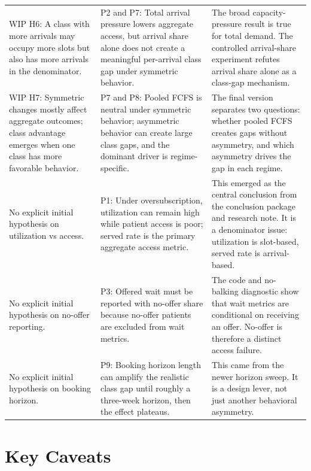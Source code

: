 \documentclass[11pt]{article}
\begin{document}
\begin{longtable}{P{0.30\textwidth} P{0.31\textwidth} P{0.31\textwidth}}
WIP H6: A class with more arrivals may occupy more slots but also has more
arrivals in the denominator. &
P2 and P7: Total arrival pressure lowers aggregate access, but arrival share
alone does not create a meaningful per-arrival class gap under symmetric
behavior. &
The broad capacity-pressure result is true for total demand. The controlled
arrival-share experiment refutes arrival share alone as a class-gap mechanism. \\

WIP H7: Symmetric changes mostly affect aggregate outcomes; class advantage
emerges when one class has more favorable behavior. &
P7 and P8: Pooled FCFS is neutral under symmetric behavior; asymmetric behavior
can create large class gaps, and the dominant driver is regime-specific. &
The final version separates two questions: whether pooled FCFS creates gaps
without asymmetry, and which asymmetry drives the gap in each regime. \\

No explicit initial hypothesis on utilization vs access. &
P1: Under oversubscription, utilization can remain high while patient access is
poor; served rate is the primary aggregate access metric. &
This emerged as the central conclusion from the conclusion package and research
note. It is a denominator issue: utilization is slot-based, served rate is
arrival-based. \\

No explicit initial hypothesis on no-offer reporting. &
P3: Offered wait must be reported with no-offer share because no-offer patients
are excluded from wait metrics. &
The code and no-balking diagnostic show that wait metrics are conditional on
receiving an offer. No-offer is therefore a distinct access failure. \\

No explicit initial hypothesis on booking horizon. &
P9: Booking horizon length can amplify the realistic class gap until roughly a
three-week horizon, then the effect plateaus. &
This came from the newer horizon sweep. It is a design lever, not just another
behavioral asymmetry. \\
\bottomrule
\end{longtable}

\section*{Key Caveats}
\end{document}
